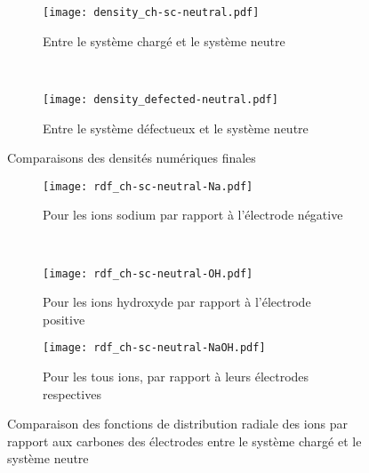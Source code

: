 \begin{figure}[h!]
    \centering
    \begin{subfigure}[t]{.49 \textwidth}
        \centering
        \texttt{[image: density\_ch-sc-neutral.pdf]}
        \caption{Entre le système chargé et le système neutre}
    \end{subfigure}%
    ~
    \begin{subfigure}[t]{.49 \textwidth}
        \centering
        \texttt{[image: density\_defected-neutral.pdf]}
        \caption{Entre le système défectueux et le système neutre}
    \end{subfigure}
    \caption{Comparaisons des densités numériques finales}
    \label{fig:comparaison_densite}
\end{figure}

\begin{figure}[h!]
    \centering
    \begin{subfigure}[t]{.49 \textwidth}
        \centering
        \texttt{[image: rdf\_ch-sc-neutral-Na.pdf]}
        \caption{Pour les ions sodium par rapport à l'électrode négative}
    \end{subfigure}%
    ~
    \begin{subfigure}[t]{.49 \textwidth}
        \centering
        \texttt{[image: rdf\_ch-sc-neutral-OH.pdf]}
        \caption{Pour les ions hydroxyde par rapport à l'électrode positive}
    \end{subfigure}

    \begin{subfigure}[t]{.49 \textwidth}
        \centering
        \texttt{[image: rdf\_ch-sc-neutral-NaOH.pdf]}
        \caption{Pour les tous ions, par rapport à leurs électrodes respectives}
    \end{subfigure}
    \caption{Comparaison des fonctions de distribution radiale des ions par rapport aux carbones des électrodes entre le système chargé et le système neutre}
    \label{fig:rdf_ch-sc-neutral}
\end{figure}

